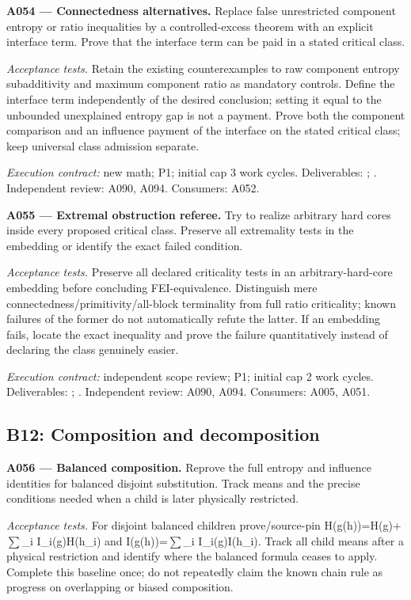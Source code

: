 \documentclass[11pt]{article}
\begin{document}
\textbf{A054 --- Connectedness alternatives.} Replace false unrestricted component entropy or ratio inequalities by a controlled-excess theorem with an explicit interface term. Prove that the interface term can be paid in a stated critical class.

\emph{Acceptance tests.} Retain the existing counterexamples to raw component entropy subadditivity and maximum component ratio as mandatory controls. Define the interface term independently of the desired conclusion; setting it equal to the unbounded unexplained entropy gap is not a payment. Prove both the component comparison and an influence payment of the interface on the stated critical class; keep universal class admission separate.

{\small\emph{Execution contract:} new math; P1; initial cap 3 work cycles. Deliverables: ; . Independent review: A090, A094. Consumers: A052.}

\textbf{A055 --- Extremal obstruction referee.} Try to realize arbitrary hard cores inside every proposed critical class. Preserve all extremality tests in the embedding or identify the exact failed condition.

\emph{Acceptance tests.} Preserve all declared criticality tests in an arbitrary-hard-core embedding before concluding FEI-equivalence. Distinguish mere connectedness/primitivity/all-block terminality from full ratio criticality; known failures of the former do not automatically refute the latter. If an embedding fails, locate the exact inequality and prove the failure quantitatively instead of declaring the class genuinely easier.

{\small\emph{Execution contract:} independent scope review; P1; initial cap 2 work cycles. Deliverables: ; . Independent review: A090, A094. Consumers: A005, A051.}

\subsection{B12: Composition and decomposition}

\textbf{A056 --- Balanced composition.} Reprove the full entropy and influence identities for balanced disjoint substitution. Track means and the precise conditions needed when a child is later physically restricted.

\emph{Acceptance tests.} For disjoint balanced children prove/source-pin H(g(h))=H(g)+$\sum$\_i I\_i(g)H(h\_i) and I(g(h))=$\sum$\_i I\_i(g)I(h\_i). Track all child means after a physical restriction and identify where the balanced formula ceases to apply. Complete this baseline once; do not repeatedly claim the known chain rule as progress on overlapping or biased composition.
\end{document}
